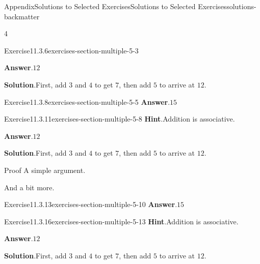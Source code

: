 \documentclass[twoside,10pt,]{article}
\newcommand{\blocktitlefont}{\relax}
\numberwithin{equation}{section}
\begin{document}
\begin{solutions-section}{Appendix}{Solutions to Selected Exercises}{}{Solutions to Selected Exercises}{}{}{solutions-backmatter}
\begin{exercisegroupcol}{4}
\begin{divisionsolutionegcol}{Exercise}{11.3.6}{}{exercises-section-multiple-5-3}
\par\smallskip%
\noindent\textbf{\blocktitlefont Answer}.\hypertarget{exercises-section-multiple-5-3-3-back}{}\quad{}\(12\)%
\par\smallskip%
\noindent\textbf{\blocktitlefont Solution}.\hypertarget{exercises-section-multiple-5-3-4-back}{}\quad{}First, add \(3\) and \(4\) to get \(7\), then add \(5\) to arrive at \(12\).%
\end{divisionsolutionegcol}%
\begin{divisionsolutionegcol}{Exercise}{11.3.8}{}{exercises-section-multiple-5-5}%
\noindent\textbf{\blocktitlefont Answer}.\hypertarget{exercises-section-multiple-5-5-2-back}{}\quad{}\(15\)%
\end{divisionsolutionegcol}%
\begin{divisionsolutionegcol}{Exercise}{11.3.11}{}{exercises-section-multiple-5-8}%
\noindent\textbf{\blocktitlefont Hint}.\hypertarget{exercises-section-multiple-5-8-2-back}{}\quad{}Addition is associative.%
\par\smallskip%
\noindent\textbf{\blocktitlefont Answer}.\hypertarget{exercises-section-multiple-5-8-3-back}{}\quad{}\(12\)%
\par\smallskip%
\noindent\textbf{\blocktitlefont Solution}.\hypertarget{exercises-section-multiple-5-8-4-back}{}\quad{}First, add \(3\) and \(4\) to get \(7\), then add \(5\) to arrive at \(12\).%
\begin{solutionproof}{Proof}
A simple argument.%
\end{solutionproof}
And a bit more.%
\end{divisionsolutionegcol}%
\begin{divisionsolutionegcol}{Exercise}{11.3.13}{}{exercises-section-multiple-5-10}%
\noindent\textbf{\blocktitlefont Answer}.\hypertarget{exercises-section-multiple-5-10-2-back}{}\quad{}\(15\)%
\end{divisionsolutionegcol}%
\begin{divisionsolutionegcol}{Exercise}{11.3.16}{}{exercises-section-multiple-5-13}%
\noindent\textbf{\blocktitlefont Hint}.\hypertarget{exercises-section-multiple-5-13-2-back}{}\quad{}Addition is associative.%
\par\smallskip%
\noindent\textbf{\blocktitlefont Answer}.\hypertarget{exercises-section-multiple-5-13-3-back}{}\quad{}\(12\)%
\par\smallskip%
\noindent\textbf{\blocktitlefont Solution}.\hypertarget{exercises-section-multiple-5-13-4-back}{}\quad{}First, add \(3\) and \(4\) to get \(7\), then add \(5\) to arrive at \(12\).%

\end{divisionsolutionegcol}
\end{exercisegroupcol}
\end{solutions-section}
\end{document}
